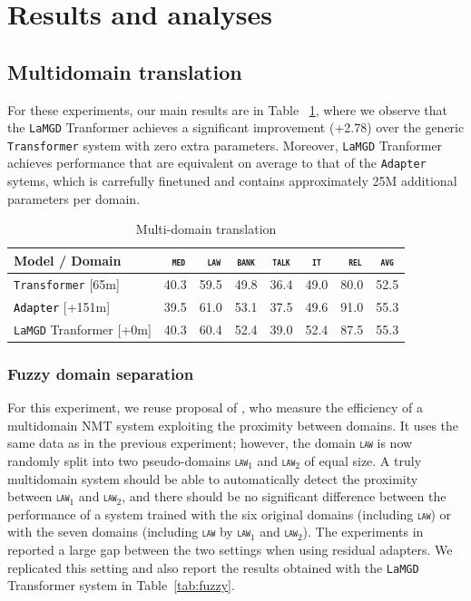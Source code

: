 \documentclass[11pt]{article}
\newcommand{\revision}[1]{\textcolor{black}{#1}}
\newcommand{\domain}[1]{\texttt{\textsc{#1}}}
\newcommand{\system}[1]{\texttt{{#1}}}
\begin{document}
\section{Results and analyses}

\subsection{Multidomain translation}
For these experiments, our main results are in Table ~\ref{tab:mdmt}, where we observe that the \system{LaMGD} Tranformer achieves a significant improvement (+2.78) over the generic \system{Transformer} system with zero extra parameters. Moreover, \system{LaMGD} Tranformer achieves performance that are equivalent on average to that of the \system{Adapter} sytems, which is carrefully finetuned and contains approximately 25M additional parameters per domain.
\begin{table}[h!]
  \centering
  \begin{tabular}{|p{4cm}|*{7}{r|}} \hline
    Model / Domain & \multicolumn{1}{c|}{\domain{ med}} & \multicolumn{1}{c|}{\domain{ law}} & \multicolumn{1}{c|}{\domain{bank}} & \multicolumn{1}{c|}{\domain{talk}} & \multicolumn{1}{c|}{\domain{ it }} & \multicolumn{1}{c|}{\domain{ rel}} & \multicolumn{1}{c|}{\domain{avg}} \\ \hline 
    \system{Transformer}  \hfill{\footnotesize[65m]} & 40.3 & 59.5 & 49.8 & 36.4 & 49.0 & 80.0  & 52.5\\
    \revision{\system{Adapter}}   \hfill{\footnotesize[+151m]}  & 39.5 & 61.0 & 53.1 & 37.5 & 49.6 & 91.0 & 55.3 \\ 
    \system{LaMGD} Tranformer   \hfill{\footnotesize[+0m]}  & 40.3 & 60.4 & 52.4 & 39.0 & 52.4 & 87.5 & 55.3 \\ 
    \hline
  \end{tabular}
  \caption{Multi-domain translation}
  \label{tab:mdmt}
\end{table}

\subsubsection{Fuzzy domain separation}
\label{ssec:fuzzy}
For this experiment, we reuse proposal of \citet{Pham21revisiting}, who measure the efficiency of a multidomain NMT system exploiting the proximity between domains. It uses the same data as in the previous experiment; however, the domain \domain{law} is now randomly split into two pseudo-domains \domain{law$_1$} and \domain{law$_2$} of equal size. A truly multidomain system should be able to automatically detect the proximity between \domain{law$_1$} and \domain{law$_2$}, and there should be no significant difference between the performance of a system trained with the six original domains (including \domain{law}) or with the seven domains (including \domain{law} by \domain{law$_1$} and \domain{law$_2$}). The experiments in \citep{Pham21revisiting} reported a large gap between the two settings when using residual adapters. We replicated this setting and also report the results obtained with the \system{LaMGD} Transformer system in Table~\ref{tab:fuzzy}. 
\end{document}
